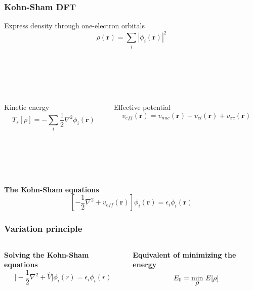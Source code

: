 \documentclass[mathserif, 10pt]{beamer}
\newcommand{\mymin}[1]{\underset{\hbox{\ensuremath{#1}}}{\text{min}}}
\begin{document}
\begin{frame}
    \frametitle{Kohn-Sham DFT}
    \centering
    Express density through one-electron orbitals
    \begin{equation}
	\nonumber
	\rho(\boldsymbol{r}) = \sum_i |\phi_i(\boldsymbol{r})|^2
    \end{equation}
    \ \\
    \ \\
    \ \\
    \ \\
    \pause
    \begin{columns}
    \begin{column}{.50\textwidth}
    \centering
    Kinetic energy
    \begin{equation}
	\nonumber
	T_s[\rho] = -\sum_i \frac{1}{2}\nabla^2\phi_i(\boldsymbol{r})
    \end{equation}
    \end{column}
    \begin{column}{.50\textwidth}
    \centering
    Effective potential
    \begin{equation}
	\nonumber
	v_{eff}(\boldsymbol{r}) = v_{nuc}(\boldsymbol{r}) + v_{el}(\boldsymbol{r}) + v_{xc}(\boldsymbol{r})
    \end{equation}
    \end{column}
    \end{columns}
    \ \\
    \ \\
    \ \\
    \ \\
    \pause
    \centering
    \textbf{The Kohn-Sham equations}
    \begin{equation}
	\nonumber
	\left[-\frac{1}{2}\nabla^2 + v_{eff}(\boldsymbol{r})\right]\phi_i(\boldsymbol{r}) = 
	\epsilon_i\phi_i(\boldsymbol{r})
    \end{equation}
\end{frame}

\begin{frame}
    \frametitle{Variation principle}
    \begin{columns}
    \begin{column}{.50\textwidth}
    \centering
    \textbf{Solving the Kohn-Sham equations}
    \begin{equation}
	\nonumber
	\bigg[-\frac{1}{2}\nabla^2 + \hat{V}\bigg]\phi_i(r) = \epsilon_i \phi_i(r)
    \end{equation}
    \end{column}
    \begin{column}{.50\textwidth}
    \centering
    \textbf{Equivalent of minimizing the energy}
    \begin{equation}
        E_0 = \mymin{\rho}\ E[\rho]
    \end{equation}
    \end{column}
    \end{columns}

    \vspace{5mm}


\end{frame}
\end{document}
